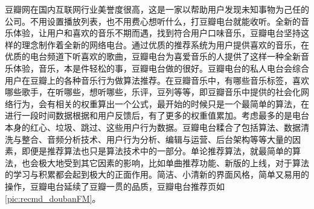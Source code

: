 		豆瓣网在国内互联网行业美誉度很高，这是一家以帮助用户发现未知事物为己任的公司\citep{recmd-douban}。不用设置播放列表，也不用费心想听什么，打豆瓣电台就能收听。全新的音乐体验，让用户和喜欢的音乐不期而遇，找到符合用户口味音乐，豆瓣电台坚持这样的理念制作着全新的网络电台。通过优质的推荐系统为用户提供喜欢的音乐，在优质的电台频道下听喜欢的歌曲，豆瓣电台为喜爱音乐的人提供了这样一种全新音乐体验，音乐，本是件轻松的事，豆瓣电台做的很好。豆瓣电台的私人电台会综合用户在豆瓣上的各种音乐行为做算法推荐\citep{recmd-doubanFM}。在豆瓣音乐中，有哪些音乐标签，喜欢哪些歌手，在听哪些，想听哪些，乐评，豆列等等，即豆瓣音乐中提供的社会化网络行为，会有相关的权重算出一个公式，最开始的时候只是一个最简单的算法，在进行一段时间数据根据和用户反馈后，有了更多的权重值累加。考虑最多的是电台本身的红心、垃圾、跳过、这些用户行为数据。豆瓣电台糅合了包括算法、数据清洗与整合、音频分析技术、用户行为分析、编辑与运营、后台架构等等大量的因素，即便是推荐算法也只是算法技术中的一部分。单论推荐算法，就最简单的算法，也会极大地受到其它因素的影响，比如单曲推荐功能、新版的上线，对于算法的学习与积累都会起到极大的正面作用。简洁、小清新的界面风格，简单又易用的操作，豆瓣电台延续了豆瓣一贯的品质，豆瓣电台推荐页如\autoref{pic:recmd_doubanFM}。
		\begin{figure}
	    \centering
	      \label{pic:recmd_doubanFM}
	    \end{figure}

